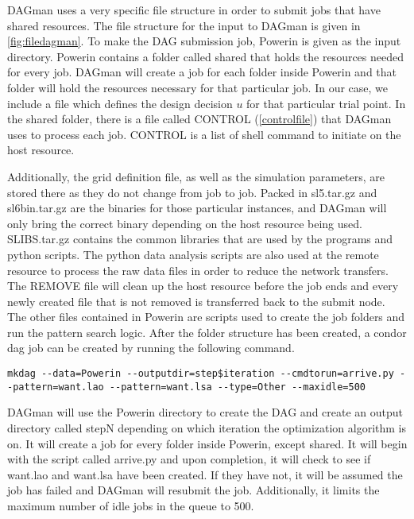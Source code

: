 DAGman uses a very specific file structure in order to submit jobs that have shared resources.  The file structure for the input to DAGman is given in \cref{fig:filedagman}.  To make the DAG submission job, Powerin is given as the input directory.  Powerin contains a folder called shared that holds the resources needed for every job.  DAGman will create a job for each folder inside Powerin and that folder will hold the resources necessary for that particular job.  In our case, we include a  file which defines the design decision $u$ for that particular trial point.  In the shared folder, there is a file called CONTROL (\cref{controlfile}) that DAGman uses to process each job.  CONTROL is a list of shell command to initiate on the host resource. 
\linespread{1}

\linespread{2}
 Additionally, the grid definition file, as well as the simulation parameters, are stored there as they do not change from job to job.  Packed in sl5.tar.gz and sl6bin.tar.gz are the binaries for those particular instances, and DAGman will only bring the correct binary depending on the host resource being used.  SLIBS.tar.gz contains the common libraries that are used by the programs and python scripts.  The python data analysis scripts are also used at the remote resource to process the raw data files in order to reduce the network transfers.  The REMOVE file will clean up the host resource before the job ends and every newly created file that is not removed is transferred back to the submit node.  The other files contained in Powerin are scripts used to create the job folders and run the pattern search logic.  After the folder structure has been created, a condor dag job can be created by running the following command.
\begin{lstlisting}
mkdag --data=Powerin --outputdir=step$iteration --cmdtorun=arrive.py --pattern=want.lao --pattern=want.lsa --type=Other --maxidle=500
\end{lstlisting}
DAGman will use the Powerin directory to create the DAG and create an output directory called stepN depending on which iteration the optimization algorithm is on.  It will create a job for every folder inside Powerin, except shared.  It will begin with the script called arrive.py and upon completion, it will check to see if want.lao and want.lsa have been created.  If they have not, it will be assumed the job has failed and DAGman will resubmit the job.  Additionally, it limits the maximum number of idle jobs in the queue to 500.

